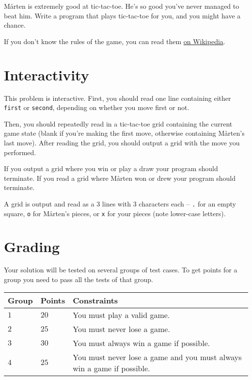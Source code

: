 Mårten is extremely good at tic-tac-toe.
He's so good you've never managed to beat him.
Write a program that plays tic-tac-toe for you, and you might have a chance.

If you don't know the rules of the game, you can read them \href{https://en.wikipedia.org/wiki/Tic\_tac\_toe}{on Wikipedia}.

\section*{Interactivity}
This problem is interactive.
First, you should read one line containing either \texttt{first} or \texttt{second}, depending on whether you move first or not.

Then, you should repeatedly read in a tic-tac-toe grid containing the current game state (blank if you're making the first move, otherwise containing Mårten's last move).
After reading the grid, you should output a grid with the move you performed.

If you output a grid where you win or play a draw your program should terminate.
If you read a grid where Mårten won or drew your program should terminate.

A grid is output and read as a 3 lines with 3 characters each -- \texttt{.} for an empty square, \texttt{o} for Mårten's pieces, or \texttt{x} for your pieces (note lower-case letters).

\section*{Grading}
Your solution will be tested on several groups of test cases. To get points for a group you need to pass all the tests of that group.

\noindent
\begin{tabular}{| l | l | l |}
	\hline
	Group & Points & Constraints\\ \hline
 $1$    & $20$        & You must play a valid game. \\ \hline
 $2$    & $25$        & You must never lose a game. \\ \hline
 $3$    & $30$        & You must always win a game if possible. \\ \hline
 $4$    & $25$        & You must never lose a game and you must always win a game if possible. \\ \hline
\end{tabular}
